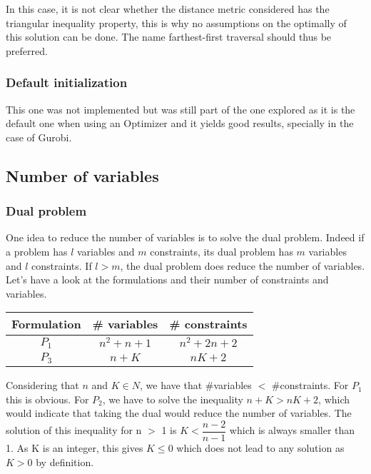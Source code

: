 \documentclass[a4paper,10pt]{article}
\begin{document}
In this case, it is not clear whether the distance metric considered has the triangular inequality property, this is why no assumptions on the optimally of this solution can be done. The name farthest-first traversal should thus be preferred. 


\subsubsection{Default initialization}
This one was not implemented but was still part of the one explored as it is the default one when using an Optimizer and it yields good results, specially in the case of Gurobi.

\subsection{Number of variables}

\subsubsection{Dual problem}
One idea to reduce the number of variables is to solve the dual problem. Indeed if a problem has $l$ variables and $m$ constraints, its dual problem has $m$ variables and $l$ constraints. If $l > m$, the dual problem does reduce the number of variables. Let's have a look at the formulations and their number of constraints and variables.

\begin{table}[h!]
\centering
\begin{tabular}{c|c|c}
    Formulation & \# variables & \# constraints \\
    \hline
    $P_1$ & $n^2 + n + 1$ & $n^2 + 2n + 2$ \\
    $P_3$ & $n + K$ & $nK+2$
\end{tabular}
\end{table}

Considering that $n$ and $K \in N$, we have that \#variables $<$ \#constraints. For $P_1$ this is obvious. For $P_2$, we have to solve the inequality $n + K > nK + 2$, which would indicate that taking the dual would reduce the number of variables. The solution of this inequality for n $>$ 1 is $K < \dfrac{n-2}{n-1}$ which is always smaller than 1. As K is an integer, this gives $K \leq 0$ which does not lead to any solution as $K > 0$ by definition. 
\end{document}

